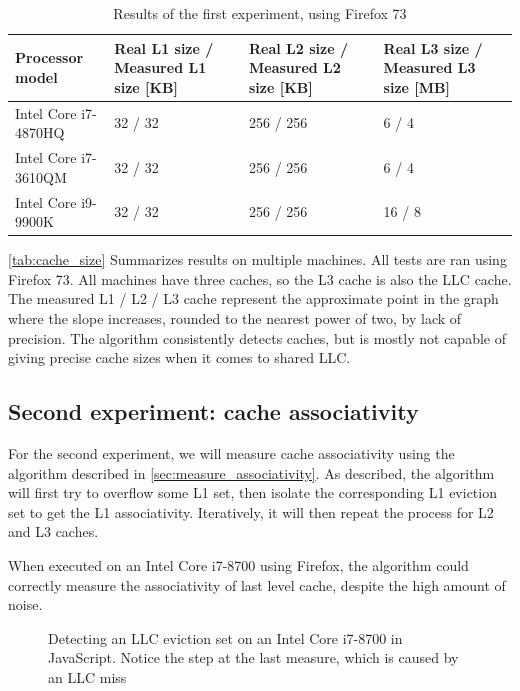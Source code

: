 \documentclass[a4paper,11pt,oneside]{report}
\begin{document}
\begin{table}
\centering
\begin{tabular}{ |p{3cm}||p{3cm}|p{3cm}|p{3cm}|  }
 \hline
 Processor model & Real L1 size / Measured L1 size [KB] & Real L2 size / Measured L2 size [KB] & Real L3 size / Measured L3 size [MB]\\
 \hline
 Intel Core i7-4870HQ & 32 / 32 &256 / 256&6 / 4\\
 \hline
 Intel Core i7-3610QM & 32 / 32  &256 / 256 &6 / 4 \\
 \hline
 Intel Core i9-9900K & 32 / 32 & 256 / 256& 16 / 8 \\
 \hline
\end{tabular}
\caption{Results of the first experiment, using Firefox 73}
\label{tab:cache_size}
\end{table}

\autoref{tab:cache_size} Summarizes results on multiple machines. All tests are ran using Firefox 73. All machines have three caches, so the L3 cache is also the LLC cache. The measured L1 / L2 / L3 cache represent the approximate point in the graph where the slope increases, rounded to the nearest power of two, by lack of precision. The algorithm consistently detects caches, but is mostly not capable of giving precise cache sizes when it comes to shared LLC.

\subsection{Second experiment: cache associativity}

For the second experiment, we will measure cache associativity using the algorithm described in \autoref{sec:measure_associativity}. As described, the algorithm will first try to overflow some L1 set, then isolate the corresponding L1 eviction set to get the L1 associativity. Iteratively, it will then repeat the process for L2 and L3 caches.

When executed on an Intel Core i7-8700 using Firefox, the algorithm could correctly measure the associativity of last level cache, despite the high amount of noise.

\begin{figure}
    \centering
    \caption{Detecting an LLC eviction set on an Intel Core i7-8700 in JavaScript. Notice the step at the last measure, which is caused by an LLC miss}
    \label{fig:8700_eviction_L3}
\end{figure}
\end{document}
